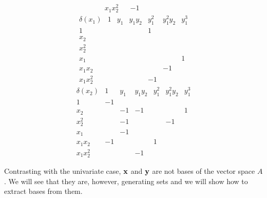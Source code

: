 \documentclass{standalone}
\begin{document}
\begin{exmp}
$$\begin{array}{c|cccccc}
	x_1x_2^2 &  & -1 &  &  &  &
\end{array}$$
$$\begin{array}{c|cccccc}
	\delta(x_1) & 1 & y_1 & y_1y_2 & y_1^2 & y_1^2y_2 & y_1^3 \\
	\hline
	1 &  &  &  & 1 &  & \\
	x_2 &  &  &  &  &  & \\
	x_2^2 &  &  &  &  &  & \\
	x_1 &  &  &  &  &  & 1\\
	x_1x_2 &  &  &  &  & -1 & \\
	x_1x_2^2 &  &  &  & -1 &  &
\end{array}$$
$$\begin{array}{c|cccccc}
	\delta(x_2) & 1 & y_1 & y_1y_2 & y_1^2 & y_1^2y_2 & y_1^3 \\
	\hline
	1 & -1 &  &  &  &  & \\
	x_2 &  & -1 & -1 &  &  & 1\\
	x_2^2 &  & -1 &  &  & -1 & \\
	x_1 &  & -1 &  &  &  & \\
	x_1x_2 & -1 &  &  & 1 &  & \\
	x_1x_2^2 &  &  & -1 &  &  &
\end{array}$$

\end{exmp}

\begin{rem}
Contrasting with the univariate case, $\bold{x}$ and $\bold{y}$ are not bases of the vector space $A$. We will see that they are, however, generating sets and we will show how to extract bases from them.
\end{rem}
\end{document}
